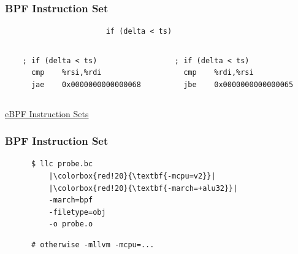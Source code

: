 \documentclass[usenames,dvipsnames, 18pt, compress, aspectratio=169]{beamer}
\begin{document}
\begin{frame}[fragile]{}
    \frametitle{BPF Instruction Set}

    \begin{center}
        \begin{verbatim}
                       if (delta < ts)
        \end{verbatim}

        \vspace{0.5cm}

        \begin{columns}
            \begin{column}{0.5\textwidth}
                \begin{verbatim}
    ; if (delta < ts)
      cmp    %rsi,%rdi
      jae    0x0000000000000068
               \end{verbatim}

           \end{column}

           \begin{column}{0.5\textwidth}
                \begin{verbatim}
; if (delta < ts)
  cmp    %rdi,%rsi
  jbe    0x0000000000000065
                \end{verbatim}

            \end{column}
        \end{columns}

    \vspace{2.0cm}
    \href{https://pchaigno.github.io/bpf/2021/10/20/ebpf-instruction-sets.html}
         {\color{links}\fontsize{10pt}{0}\selectfont eBPF Instruction Sets}
    \end{center}
\end{frame}

\begin{frame}[fragile]{}
    \frametitle{BPF Instruction Set}

    \begin{center}
        \begin{verbatim}
      $ llc probe.bc
          |\colorbox{red!20}{\textbf{-mcpu=v2}}|
          |\colorbox{red!20}{\textbf{-march=+alu32}}|
          -march=bpf
          -filetype=obj
          -o probe.o
        \end{verbatim}
        \begin{verbatim}
      # otherwise -mllvm -mcpu=...
        \end{verbatim}

    \end{center}
\end{frame}
\end{document}
